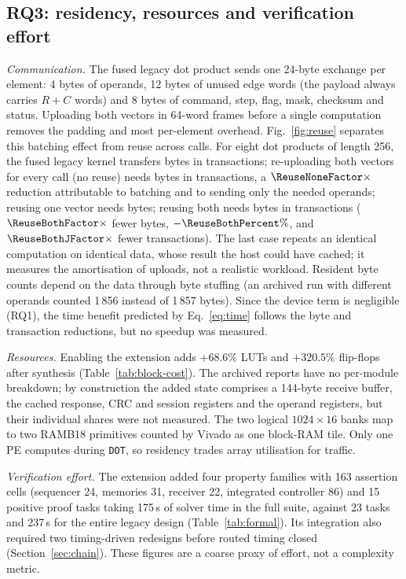 \subsection{RQ3: residency, resources and verification effort}
\label{sec:rq3}

\emph{Communication.} The fused legacy dot product sends one 24-byte
exchange per element: 4 bytes of operands, 12 bytes of unused edge words
(the payload always carries $R+C$ words) and 8 bytes of command, step,
flag, mask, checksum and status. Uploading both vectors in 64-word frames
before a single computation removes the padding and most per-element
overhead. Fig.~\ref{fig:reuse} separates this batching effect from reuse
across calls. For eight dot products of length 256, the fused legacy kernel
transfers \ReuseStreamBytes{} bytes in \ReuseStreamJ{} transactions;
re-uploading both vectors for every call (no reuse) needs
\ReuseNoneBytes{} bytes in \ReuseNoneJ{} transactions, a
$\ReuseNoneFactor\times$ reduction attributable to batching and to sending
only the needed operands; reusing one vector needs \ReuseOneBytes{} bytes;
reusing both needs \ReuseBothBytes{} bytes in \ReuseBothJ{} transactions
($\ReuseBothFactor\times$ fewer bytes, $-\ReuseBothPercent\%$, and
$\ReuseBothJFactor\times$ fewer transactions). The last case repeats an
identical computation on identical data, whose result the host could have
cached; it measures the amortisation of uploads, not a realistic workload.
Resident byte counts depend on the data through byte stuffing (an archived
run with different operands counted 1\,856 instead of 1\,857 bytes). Since
the device term is negligible (RQ1), the time benefit predicted by
Eq.~\eqref{eq:time} follows the byte and transaction reductions, but no
speedup was measured.

\emph{Resources.} Enabling the extension adds $+68.6\%$ LUTs and $+320.5\%$
flip-flops after synthesis (Table~\ref{tab:block-cost}). The archived
reports have no per-module breakdown; by construction the added state
comprises a 144-byte receive buffer, the cached response, CRC and session
registers and the operand registers, but their individual shares were not
measured. The two logical $1024\times16$ banks map to two RAMB18
primitives counted by Vivado as one block-RAM tile. Only one PE computes
during \texttt{DOT}, so residency trades array utilisation for traffic.

\emph{Verification effort.} The extension added four property families with
163 assertion cells (sequencer 24, memories 31, receiver 22, integrated
controller 86) and 15 positive proof tasks taking 175\,s of solver time in
the full suite, against 23 tasks and 237\,s for the entire legacy design
(Table~\ref{tab:formal}). Its integration also required two timing-driven
redesigns before routed timing closed (Section~\ref{sec:chain}). These
figures are a coarse proxy of effort, not a complexity metric.




